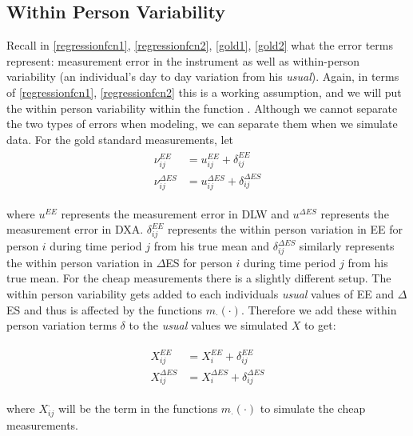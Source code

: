 \documentclass[11pt]{article}\usepackage[]{graphicx}\usepackage[]{color}
\begin{document}
\subsection{Within Person Variability}

Recall in \eqref{regressionfcn1}, \eqref{regressionfcn2}, \eqref{gold1}, \eqref{gold2} what the error terms represent: measurement error in the instrument as well as within-person variability (an individual's day to day variation from his \emph{usual}). Again, in terms of \eqref{regressionfcn1}, \eqref{regressionfcn2} this is a working assumption, and we will put the within person variability within the function . Although we cannot separate the two types of errors when modeling, we can separate them when we simulate data. For the gold standard measurements, let 
\begin{align}
\begin{split}
\label{wpw}
\nu_{ij}^{EE} &= u_{ij}^{EE} + \delta_{ij}^{EE} \\
\nu_{ij}^{\Delta ES} &= u_{ij}^{\Delta ES} + \delta_{ij}^{\Delta ES}
\end{split}
\end{align}

where $u^{EE}$ represents the measurement error in DLW and $u^{\Delta ES}$ represents the measurement error in DXA. $\delta_{ij}^{EE}$ represents the within person variation in EE for person $i$ during time period $j$ from his true mean and  $\delta_{ij}^{\Delta ES}$ similarly represents the within person variation in $\Delta$ES for person $i$ during time period $j$ from his true mean. For the cheap measurements there is a slightly different setup. The within person variability gets added to each individuals \emph{usual} values of EE and $\Delta$ES and thus is affected by the functions $m_{\cdot}(\cdot)$. Therefore we add these within person variation terms $\delta$ to the \emph{usual} values we simulated $X$ to get:

\begin{align}
\begin{split}
\label{wpy}
X_{ij}^{EE} &= X_{i}^{EE} + \delta_{ij}^{EE} \\
X_{ij}^{\Delta ES} &= X_{i}^{\Delta ES} + \delta_{ij}^{\Delta ES}
\end{split}
\end{align} 

where $X_{ij}^{\cdot}$ will be the term in the functions $m_{\cdot}(\cdot)$ to simulate the cheap measurements.
\end{document}
